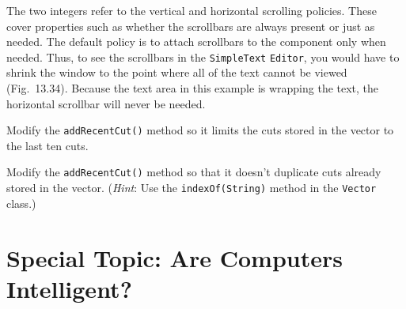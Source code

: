 \noindent The two integers refer to the vertical and horizontal
scrolling policies. These cover properties such as whether the
scrollbars are always present or just as needed. The default policy is
to attach scrollbars to the component only when needed. Thus, to see
the scrollbars in the {\tt SimpleText} {\tt Editor}, you would have to shrink
the window to the point where all of the text cannot be viewed
(Fig.~13.34).  Because the text area in this example
is wrapping the text, the horizontal scrollbar will never be needed.


\begin{SSTUDY}

\item  Modify the {\tt addRecentCut()} method so it limits the cuts stored
in the vector to the last ten cuts.


\item  Modify the {\tt addRecentCut()} method so that it doesn't duplicate
cuts already stored in the vector. ({\it Hint}: Use the 
{\tt indexOf(String)} method in the {\tt Vector} class.)

\end{SSTUDY}

\section*{{\color{cyan}Special Topic:} Are Computers Intelligent?}

